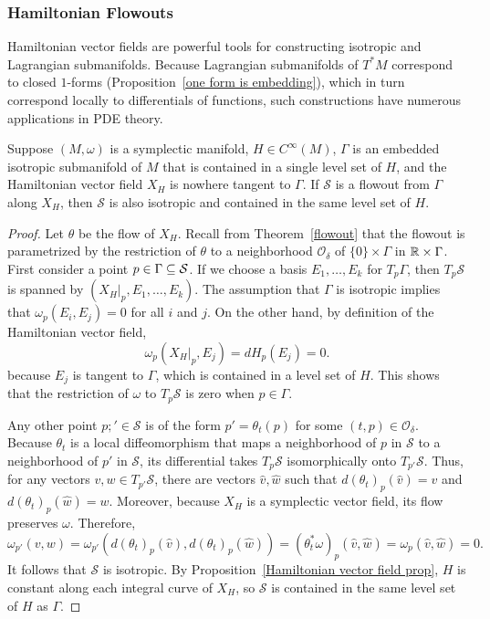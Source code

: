 \subsubsection{Hamiltonian Flowouts}
Hamiltonian vector fields are powerful tools for constructing isotropic and Lagrangian submanifolds. Because Lagrangian submanifolds of $T^*M$ correspond to closed $1$-forms (Proposition~\ref{one form is embedding}), which in turn correspond locally to differentials of functions, such constructions have numerous applications in PDE theory.
\begin{theorem}\label{Hamiltonian flowout}
Suppose $(M,\omega)$ is a symplectic manifold, $H\in C^\infty(M)$, $\Gamma$ is an embedded isotropic submanifold of $M$ that is contained in a single level set of $H$, and the Hamiltonian vector field $X_H$ is nowhere tangent to $\Gamma$. If $\mathcal{S}$ is a flowout from $\Gamma$ along $X_H$, then $\mathcal{S}$ is also isotropic and contained in the same level set of $H$.
\end{theorem}
\begin{proof}
Let $\theta$ be the flow of $X_H$. Recall from Theorem~\ref{flowout} that the flowout is parametrized by the restriction of $\theta$ to a neighborhood $\mathcal{O}_\delta$ of $\{0\}\times\Gamma$ in $\mathbb{R}\times\Gamma$. First consider a point $p\in\Gamma\subseteq\mathcal{S}$. If we choose a basis $E_1,\dots,E_k$ for $T_p\Gamma$, then $T_p\mathcal{S}$ is spanned by $(X_H|_p,E_1,\dots,E_k)$. The assumption that $\Gamma$ is isotropic implies that $\omega_p(E_i,E_j)=0$ for all $i$ and $j$. On the other hand, by definition of the Hamiltonian vector field,
\[\omega_p(X_H|_p,E_j)=dH_p(E_j)=0.\]
because $E_j$ is tangent to $\Gamma$, which is contained in a level set of $H$. This shows that the restriction of $\omega$ to $T_p\mathcal{S}$ is zero when $p\in\Gamma$.\par
Any other point $p;'\in\mathcal{S}$ is of the form $p'=\theta_t(p)$ for some $(t,p)\in\mathcal{O}_\delta$. Because $\theta_t$ is a local diffeomorphism that maps a neighborhood of $p$ in $\mathcal{S}$ to a neighborhood of $p'$ in $\mathcal{S}$, its differential takes $T_p\mathcal{S}$ isomorphically onto $T_{p'}\mathcal{S}$. Thus, for any vectors $v,w\in T_{p'}\mathcal{S}$, there are vectors $\widehat{v},\widehat{w}$ such that $d(\theta_t)_p(\widehat{v})=v$ and $d(\theta_t)_p(\widehat{w})=w$. Moreover, because $X_H$ is a symplectic vector field, its flow preserves $\omega$. Therefore,
\[\omega_{p'}(v,w)=\omega_{p'}(d(\theta_t)_p(\widehat{v}),d(\theta_t)_p(\widehat{w}))=(\theta_t^*\omega)_p(\widehat{v},\widehat{w})=\omega_p(\widehat{v},\widehat{w})=0.\]
It follows that $\mathcal{S}$ is isotropic. By Proposition~\ref{Hamiltonian vector field prop}, $H$ is constant along each integral curve of $X_H$, so $\mathcal{S}$ is contained in the same level set of $H$ as $\Gamma$.
\end{proof}
